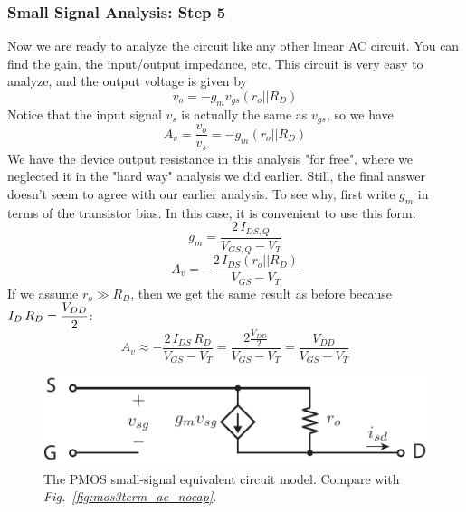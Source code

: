 \subsubsection{Small Signal Analysis:  Step 5}
Now we are ready to analyze the circuit like any other linear AC circuit.  You can find the gain, the input/output impedance, etc.  This circuit is very easy to analyze, and the output voltage is given by
    \begin{equation}
        v_o = -g_m v_{gs} \left( r_o \big|\big| R_D \right)
    \end{equation}
Notice that the input signal $v_s$ is actually the same as $v_{gs}$, so we have
    \begin{equation}
        A_v = \frac{v_o}{v_s} = -g_m\left( r_o \big|\big| R_D \right)
    \end{equation}
We have the device output resistance in this analysis "for free", where we neglected it in the "hard way" analysis we did earlier.  Still, the final answer doesn't seem to agree with our earlier analysis.  To see why, first write $g_m$ in terms of the transistor bias.  In this case, it is convenient to use this form:
    \begin{equation}
        g_m = \frac{2\,I_{DS,Q}}{V_{GS,Q} - V_T}
    \end{equation}
    \begin{equation}
        A_v =  -\frac{2\,I_{DS}\left( r_o \big|\big| R_D \right)}{V_{GS} - V_T}
    \end{equation}
If we assume $r_o \gg R_D$, then we get the same result as before because $I_D\,R_D = \mathlarger{\frac{V_{DD}}{2}}$:
    \begin{equation}
        A_v \approx  -\frac{2\,I_{DS}\,R_D}{V_{GS} - V_T} = \frac{2\frac{V_{DD}}{2}}{V_{GS} - V_T} = \frac{V_{DD}}{V_{GS} - V_T}
    \end{equation}
\newpage
\begin{figure}[t]
\centering
\includegraphics[scale=1.5]{pmos3term_dc}
\caption{The PMOS small-signal equivalent circuit model.  Compare with \emph{Fig.~\ref{fig:mos3term_ac_nocap}}.}
\label{fig:pmos3term_dc}
\end{figure}
